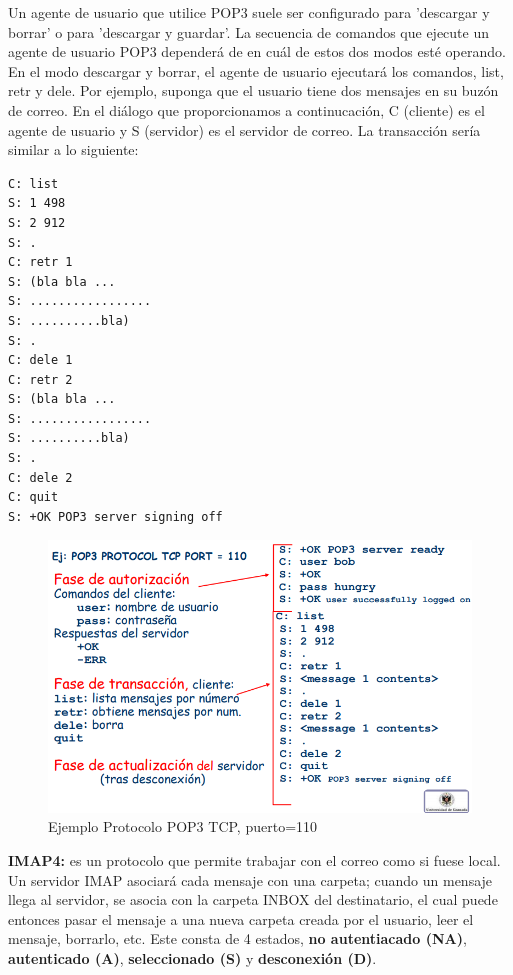 \documentclass[a4paper,11pt]{article}
\begin{document}
Un agente de usuario que utilice POP3 suele ser configurado para 'descargar y borrar' o para 'descargar y guardar'. La secuencia de comandos que ejecute un agente de usuario POP3 dependerá de en cuál de estos dos modos esté operando. En el modo descargar y borrar, el agente de usuario ejecutará los comandos, list, retr y dele. Por ejemplo, suponga que el usuario tiene dos mensajes en su buzón de correo. En el diálogo que proporcionamos a continucación, C (cliente) es el agente de usuario y S (servidor) es el servidor de correo. La transacción sería similar a lo siguiente:

\begin{verbatim}
C: list
S: 1 498
S: 2 912
S: .
C: retr 1
S: (bla bla ...
S: .................
S: ..........bla)
S: .
C: dele 1
C: retr 2
S: (bla bla ...
S: .................
S: ..........bla)
S: .
C: dele 2
C: quit
S: +OK POP3 server signing off
\end{verbatim}

\begin{figure}[h]
\centering
\caption{Ejemplo Protocolo POP3 TCP, puerto=110}
\includegraphics[scale=1,width=1\textwidth]{pop3.png}
\end{figure}

\textbf{IMAP4:} es un protocolo que permite trabajar con el correo como si fuese local. Un servidor IMAP asociará cada mensaje con una carpeta; cuando un mensaje llega al servidor, se asocia con la carpeta INBOX del destinatario, el cual puede entonces pasar el mensaje a una nueva carpeta creada por el usuario, leer el mensaje, borrarlo, etc. Este consta de 4 estados, \textbf{no autentiacado (NA)}, \textbf{autenticado (A)}, \textbf{seleccionado (S)} y \textbf{desconexión (D)}. \\
\end{document}
